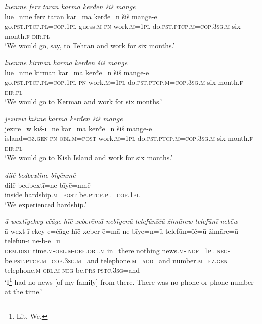 \ea \label{ŽM.23}
\textit{luēnmē ferz tārān kārmā kerđen šiš māngē} \\ 
\gll luē=nmē ferz tārān kār=mā kerđe=n šiš mānge-ē \\ 
 go\textsc{.pst}\textsc{.ptcp}\textsc{.pl}\textsc{=cop}\textsc{.\textsc{1pl}} guess\textsc{.m} \textsc{pn} work\textsc{.m}\textsc{=\textsc{1pl}} do\textsc{.pst}\textsc{.ptcp}\textsc{.m}\textsc{=cop}\textsc{.3sg}\textsc{.m} six month\textsc{.f}\textsc{-dir}\textsc{.pl} \\ 
\glt `We would go, say, to Tehran and work for six months.'
\z 
 
\ea \label{ŽM.24}
\textit{luēnmē kirmān kārmā kerđen šiš māngē} \\ 
\gll luē=nmē kirmān kār=mā kerđe=n šiš mānge-ē \\ 
 go\textsc{.pst}\textsc{.ptcp}\textsc{.pl}\textsc{=cop}\textsc{.\textsc{1pl}} \textsc{pn} work\textsc{.m}\textsc{=\textsc{1pl}} do\textsc{.pst}\textsc{.ptcp}\textsc{.m}\textsc{=cop}\textsc{.3sg}\textsc{.m} six month\textsc{.f}\textsc{-dir}\textsc{.pl} \\ 
\glt `We would go to Kerman and work for six months.'
\z 
 
\ea \label{ŽM.25}
\textit{jezīrew kīšīne kārmā kerđen šiš māngē} \\ 
\gll jezīre=w kīš-ī=ne kār=mā kerđe=n šiš mānge-ē \\ 
 island\textsc{=ez.gen} \textsc{pn}\textsc{-obl}\textsc{.m}\textsc{=\textsc{post}} work\textsc{.m}\textsc{=\textsc{1pl}} do\textsc{.pst}\textsc{.ptcp}\textsc{.m}\textsc{=cop}\textsc{.3sg}\textsc{.m} six month\textsc{.f}\textsc{-dir}\textsc{.pl} \\ 
\glt `We would go to Kish Island and work for six months.'
\z 
 
\ea \label{ŽM.31}
\textit{dilē bedbextīne bīyēnmē} \\ 
\gll dilē bedbextī=ne bīyē=nmē \\ 
 inside hardship\textsc{.m}\textsc{=\textsc{post}} be\textsc{.ptcp}\textsc{.pl}\textsc{=cop}\textsc{.\textsc{1pl}} \\ 
\glt `We experienced hardship.'
\z 
 
\ea \label{ŽM.32}
\textit{ā wextīyekey ečāge hīč xeberēmā nebīyenū telefūnīčū žimārew telefūnī nebēw} \\ 
\gll ā wext-ī-ekey e=čāge hīč xeber-ē=mā ne-bīye=n=ū telefūn=īč=ū žimāre=ū telefūn-ī ne-b-ē=ū \\ 
 \textsc{dem.dist} time\textsc{.m}\textsc{-obl}\textsc{.m}\textsc{-def}\textsc{.obl}\textsc{.m} in=there nothing news\textsc{.m}\textsc{-indf}\textsc{=\textsc{1pl}} \textsc{neg-}be\textsc{.pst}\textsc{.ptcp}\textsc{.m}\textsc{=cop}\textsc{.3sg}\textsc{.m}=and telephone\textsc{.m}\textsc{=add}=and number\textsc{.m}\textsc{=ez.gen} telephone\textsc{.m}\textsc{-obl}\textsc{.m} \textsc{neg-}be\textsc{.prs}\textsc{-pstc}\textsc{.3sg}=and \\ 
\glt `I\footnote{Lit. We.}  had no news [of my family] from there. There was no phone or phone number at the time.'
\z 
 
